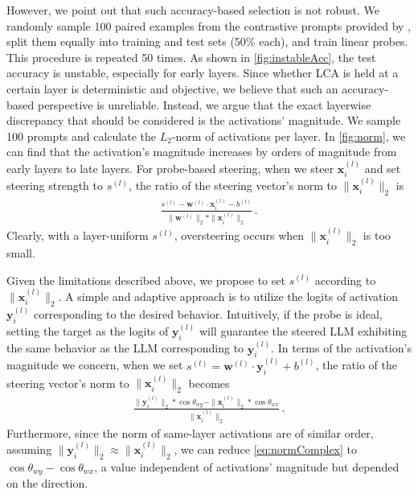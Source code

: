 \documentclass{article}
\theoremstyle{plain}
\theoremstyle{definition}
\theoremstyle{remark}
\begin{document}
However, we point out that such accuracy-based selection is not robust. We randomly sample 100 paired examples from the contrastive prompts provided by \citet{singleDirection}, split them equally into training and test sets (50\% each), and train linear probes. This procedure is repeated 50 times. As shown in \cref{fig:instableAcc}, the test accuracy is unstable, especially for early layers. Since whether LCA is held at a certain layer is deterministic and objective, we believe that such an accuracy-based perspective is unreliable. Instead, we argue that the exact layerwise discrepancy that should be considered is the activations' magnitude. We sample 100 prompts and calculate the $L_{2}$-norm of activations per layer. In \cref{fig:norm}, we can find that the activation's magnitude increases by orders of magnitude from early layers to late layers. For probe-based steering, when we steer $\mathbf{x}_{i}^{(l)}$ and set steering strength to $s^{(l)}$, the ratio of the steering vector's norm to $\|\mathbf{x}^{(l)}_{i}\|_{2}$ is
\begin{align}
	\frac{s^{(l)} -  \mathbf{w}^{(l)}\cdot\mathbf{x}^{(l)}_{i}  - b^{(l)}}{\|\mathbf{w}^{(l)}\|_{2} * \|\mathbf{x}^{(l)}_{i}\|_{2}}\,.
\end{align}
Clearly, with a layer-uniform $s^{(l)}$, oversteering occurs when $\|\mathbf{x}^{(l)}_{i}\|_{2}$ is too small.

Given the limitations described above, we propose to set $s^{(l)}$ according to $\|\mathbf{x}^{(l)}_{i}\|_{2}$. A simple and adaptive approach is to utilize the logits of activation $\mathbf{y}_{i}^{(l)}$ corresponding to the desired behavior. Intuitively, if the probe is ideal, setting the target as the logits of $\mathbf{y}_{i}^{(l)}$ will guarantee the steered LLM exhibiting the same behavior as the LLM corresponding to $\mathbf{y}_{i}^{(l)}$. In terms of the activation's magnitude we concern, when we set $s^{(l)} = \mathbf{w}^{(l)} \cdot \mathbf{y}_{i}^{(l)} + b^{(l)}$, the ratio of the steering vector's norm to $\|\mathbf{x}^{(l)}_{i}\|_{2}$ becomes
\begin{align}
	\frac{\|\mathbf{y}_{i}^{(l)}\|_{2} * \cos\theta_{wy} - \|\mathbf{x}^{(l)}_{i}\|_{2} * \cos\theta_{wx}}{\|\mathbf{x}^{(l)}_{i}\|_{2}}\,.\label{eq:normComplex}
\end{align}
Furthermore, since the norm of same-layer activations are of similar order, assuming $\|\mathbf{y}_{i}^{(l)}\|_{2} \approx \|\mathbf{x}^{(l)}_{i}\|_{2}$, we can reduce \cref{eq:normComplex} to $\cos\theta_{wy} - \cos\theta_{wx}$, a value independent of activations' magnitude but depended on the direction.
\end{document}
